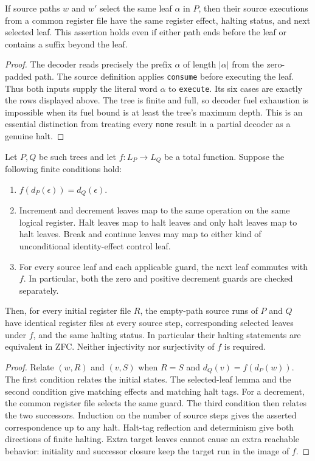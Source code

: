 \begin{lemma}
If source paths $w$ and $w'$ select the same leaf $\alpha$ in $P$,
then their source executions from a common register file have the same
register effect, halting status, and next selected leaf.  This assertion
holds even if either path ends before the leaf or contains a suffix
beyond the leaf.
\end{lemma}
\begin{proof}
The decoder reads precisely the prefix $\alpha$ of length $|\alpha|$
from the zero-padded path.  The source definition applies
\texttt{consume} before executing the leaf.  Thus both inputs supply
the literal word $\alpha$ to \texttt{execute}.  Its six cases are exactly
the rows displayed above.  The tree is finite and full, so decoder fuel
exhaustion is impossible when its fuel bound is at least the tree's
maximum depth.  This is an essential distinction from treating every
\texttt{none} result in a partial decoder as a genuine halt.
\end{proof}

\begin{theorem}
Let $P,Q$ be such trees and let $f:L_P\to L_Q$ be a total function.
Suppose the following finite conditions hold:
\begin{enumerate}
\item $f(d_P(\epsilon))=d_Q(\epsilon)$.
\item Increment and decrement leaves map to the same operation on the
same logical register.  Halt leaves map to halt leaves and only halt
leaves map to halt leaves.  Break and continue leaves may map to either
kind of unconditional identity-effect control leaf.
\item For every source leaf and each applicable guard, the next leaf
commutes with $f$.  In particular, both the zero and positive decrement
guards are checked separately.
\end{enumerate}
Then, for every initial register file $R$, the empty-path source runs
of $P$ and $Q$ have identical register files at every source step,
corresponding selected leaves under $f$, and the same halting status.
In particular their halting statements are equivalent in ZFC.
Neither injectivity nor surjectivity of $f$ is required.
\end{theorem}
\begin{proof}
Relate $(w,R)$ and $(v,S)$ when $R=S$ and
$d_Q(v)=f(d_P(w))$.  The first condition relates the initial states.
The selected-leaf lemma and the second condition give matching effects
and matching halt tags.  For a decrement, the common register file
selects the same guard.  The third condition then relates the two
successors.  Induction on the number of source steps gives the asserted
correspondence up to any halt.  Halt-tag reflection and determinism
give both directions of finite halting.  Extra target leaves cannot
cause an extra reachable behavior: initiality and successor closure
keep the target run in the image of $f$.
\end{proof}

